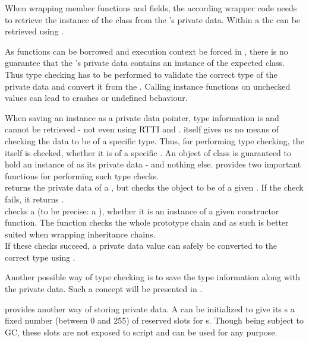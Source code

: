 When wrapping member functions and fields, the according wrapper code needs to retrieve the instance of the  class from the  's private data. Within a  the   can be retrieved using .

As functions can be borrowed and execution context be forced in , there is no guarantee that the 's private data contains an instance of the expected class. Thus type checking has to be performed to validate the correct type of the private data and convert it from the . Calling instance functions on unchecked values can lead to crashes or undefined behaviour.

When saving an instance as a private data  pointer, type information is  and cannot be retrieved - not even using RTTI and .  itself gives us no means of checking the data to be of a specific type. Thus, for performing type checking, the  itself is checked, whether it is of a specific . An object of class  is guaranteed to hold an instance of  as its private data - and nothing else.  provides two important functions for performing such type checks.\\
 returns the private data of a , but checks the object to be of a given . If the check fails, it returns .\\
 checks a  (to be precise: a ), whether it is an instance of a given constructor function. The function checks the whole prototype chain and as such is better suited when wrapping inheritance chains.\\
If these checks succeed, a private data value can safely be converted to the correct  type using .

Another possible way of type checking is to save the type information along with the private data. Such a concept will be presented in .

 provides another way of storing private data. A  can be initialized to give its s a fixed number (between 0 and 255) of reserved slots for s. Though being subject to GC, these slots are not exposed to script and can be used for any purpose.

